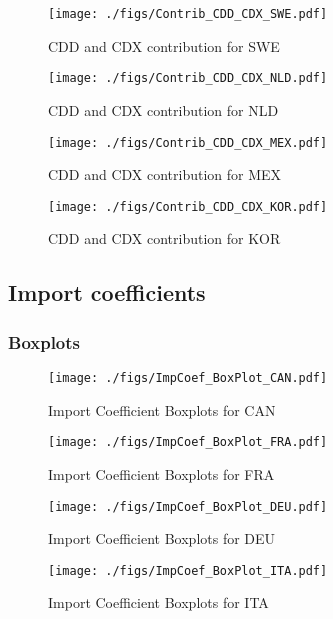\documentclass[11pt]{article}
\begin{document}
\begin{figure}[t]
\centering
\texttt{[image: ./figs/Contrib\_CDD\_CDX\_SWE.pdf]}
\caption{CDD and CDX contribution for SWE}
\end{figure}

\begin{figure}[t]
\centering
\texttt{[image: ./figs/Contrib\_CDD\_CDX\_NLD.pdf]}
\caption{CDD and CDX contribution for NLD}
\end{figure}

\begin{figure}[t]
\centering
\texttt{[image: ./figs/Contrib\_CDD\_CDX\_MEX.pdf]}
\caption{CDD and CDX contribution for MEX}
\end{figure}

\begin{figure}[t]
\centering
\texttt{[image: ./figs/Contrib\_CDD\_CDX\_KOR.pdf]}
\caption{CDD and CDX contribution for KOR}
\end{figure}
\subsection{Import coefficients}
\label{sec:org24cb64c}

\subsubsection{Boxplots}
\label{sec:org4fb4e9a}


\begin{figure}[t]
\centering
\texttt{[image: ./figs/ImpCoef\_BoxPlot\_CAN.pdf]}
\caption{Import Coefficient Boxplots for CAN}
\end{figure}

\begin{figure}[t]
\centering
\texttt{[image: ./figs/ImpCoef\_BoxPlot\_FRA.pdf]}
\caption{Import Coefficient Boxplots for FRA}
\end{figure}

\begin{figure}[t]
\centering
\texttt{[image: ./figs/ImpCoef\_BoxPlot\_DEU.pdf]}
\caption{Import Coefficient Boxplots for DEU}
\end{figure}

\begin{figure}[t]
\centering
\texttt{[image: ./figs/ImpCoef\_BoxPlot\_ITA.pdf]}
\caption{Import Coefficient Boxplots for ITA}
\end{figure}
\end{document}
